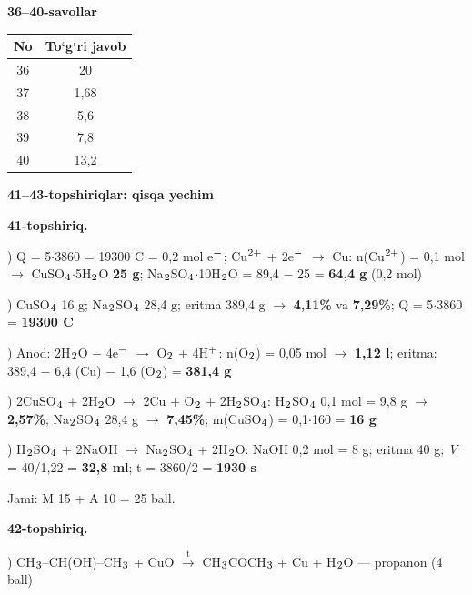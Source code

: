 \documentclass[11pt,a4paper]{article}
\renewcommand{\textsubscript}[1]{\ensuremath{_{\text{\fontsize{8}{8}\selectfont #1}}}}
\renewcommand{\textsuperscript}[1]{\ensuremath{^{\text{\fontsize{8}{8}\selectfont #1}}}}
\begin{document}
\noindent\textbf{36--40-savollar}\par\smallskip
\noindent\begin{tabular}{|c|c|}\hline \textbf{No} & \textbf{To`g`ri javob}\\\hline
36 & 20\\\hline
37 & 1,68\\\hline
38 & 5,6\\\hline
39 & 7,8\\\hline
40 & 13,2\\\hline
\end{tabular}\par\medskip
\noindent\textbf{41--43-topshiriqlar: qisqa yechim}\par\smallskip
\noindent\textbf{41-topshiriq.}\par
{}) Q = 5$\cdot$3860 = 19300 C = 0,2 mol e\textsuperscript{$-$}; Cu\textsuperscript{2+} + 2e\textsuperscript{$-$} $\to$ Cu: n(Cu\textsuperscript{2+}) = 0,1 mol $\to$ CuSO\textsubscript{4}$\cdot$5H\textsubscript{2}O \textbf{25 g}; Na\textsubscript{2}SO\textsubscript{4}$\cdot$10H\textsubscript{2}O = 89,4 $-$ 25 = \textbf{64,4 g} (0,2 mol)\par
{}) CuSO\textsubscript{4} 16 g; Na\textsubscript{2}SO\textsubscript{4} 28,4 g; eritma 389,4 g $\to$ \textbf{4,11\%} va \textbf{7,29\%}; Q = 5$\cdot$3860 = \textbf{19300 C}\par
{}) Anod: 2H\textsubscript{2}O $-$ 4e\textsuperscript{$-$} $\to$ O\textsubscript{2} + 4H\textsuperscript{+}: n(O\textsubscript{2}) = 0,05 mol $\to$ \textbf{1,12 l}; eritma: 389,4 $-$ 6,4 (Cu) $-$ 1,6 (O\textsubscript{2}) = \textbf{381,4 g}\par
{}) 2CuSO\textsubscript{4} + 2H\textsubscript{2}O $\to$ 2Cu + O\textsubscript{2} + 2H\textsubscript{2}SO\textsubscript{4}: H\textsubscript{2}SO\textsubscript{4} 0,1 mol = 9,8 g $\to$ \textbf{2,57\%}; Na\textsubscript{2}SO\textsubscript{4} 28,4 g $\to$ \textbf{7,45\%}; m(CuSO\textsubscript{4}) = 0,1$\cdot$160 = \textbf{16 g}\par
{}) H\textsubscript{2}SO\textsubscript{4} + 2NaOH $\to$ Na\textsubscript{2}SO\textsubscript{4} + 2H\textsubscript{2}O: NaOH 0,2 mol = 8 g; eritma 40 g; \textit{V} = 40/1,22 = \textbf{32,8 ml}; t = 3860/2 = \textbf{1930 s}\par
\noindent Jami: M 15 + A 10 = 25 ball.\par
\noindent\textbf{42-topshiriq.}\par
{}) CH\textsubscript{3}--CH(OH)--CH\textsubscript{3} + CuO $\xrightarrow{\text{t}}$ CH\textsubscript{3}COCH\textsubscript{3} + Cu + H\textsubscript{2}O --- propanon (4 ball)\par
\end{document}
